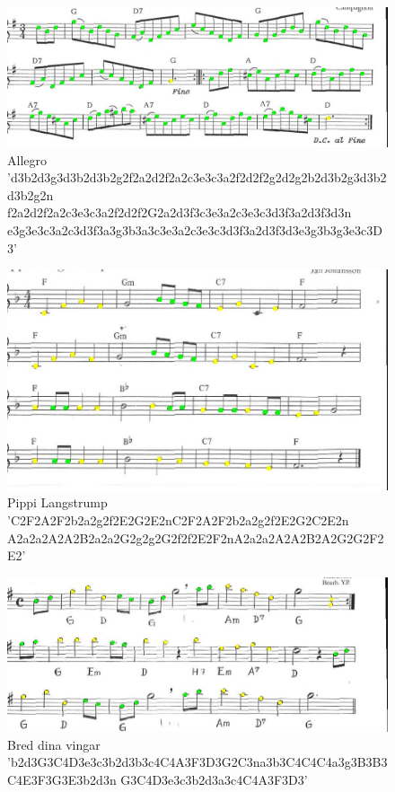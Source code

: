 \begin{figure}
    \centering
		\includegraphics[width=\textwidth]{im5s_compare.jpg}
		\caption[Allegro]{Allegro 'd3b2d3g3d3b2d3b2g2f2a2d2f2a2c3e3c3a2f2d2f2g2d2g2b2d3b2g3d3b2d3b2g2n \newline f2a2d2f2a2c3e3c3a2f2d2f2G2a2d3f3c3e3a2c3e3c3d3f3a2d3f3d3n \newline e3g3e3c3a2c3d3f3a3g3b3a3c3e3a2c3e3c3d3f3a2d3f3d3e3g3b3g3e3c3D3'}
\end{figure}

\begin{figure}
    \centering
		\includegraphics[width=\textwidth]{im8s_compare.jpg}
		\caption[Pippi Langstrump]{Pippi Langstrump 'C2F2A2F2b2a2g2f2E2G2E2nC2F2A2F2b2a2g2f2E2G2C2E2n \newline A2a2a2A2A2B2a2a2G2g2g2G2f2f2E2F2nA2a2a2A2A2B2A2G2G2F2E2'}
\end{figure}

\begin{figure}
    \centering
		\includegraphics[width=\textwidth]{im9s_compare.jpg}
		\caption[Bred dina vingar]{Bred dina vingar 'b2d3G3C4D3e3c3b2d3b3c4C4A3F3D3G2C3n\newline a3b3C4C4C4a3g3B3B3C4E3F3G3E3b2d3n \newline G3C4D3e3c3b2d3a3c4C4A3F3D3'}
\end{figure}

